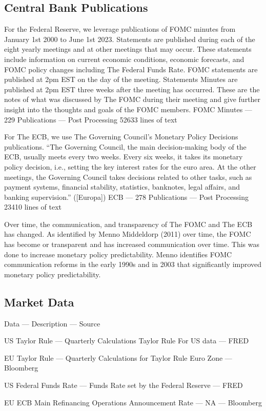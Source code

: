 \documentclass[12pt, letterpaper]{article}
\begin{document}
\subsection{Central Bank Publications}
For the Federal Reserve, we leverage publications of FOMC minutes from January 1st 2000 to June 1st 2023. Statements are published during each of the eight yearly meetings and at other meetings that may occur. These statements include information on current economic conditions, economic forecasts, and FOMC policy changes including The Federal Funds Rate. FOMC statements are published at 2pm EST on the day of the meeting. Statements Minutes are published at 2pm EST three weeks after the meeting has occurred. These are the notes of what was discussed by The FOMC during their meeting and give further insight into the thoughts and goals of the FOMC members. FOMC Minutes — 229 Publications — Post Processing 52633 lines of text 

For The ECB, we use The Governing Council’s Monetary Policy Decisions publications. “The Governing Council, the main decision-making body of the ECB, usually meets every two weeks. Every six weeks, it takes its monetary policy decision, i.e., setting the key interest rates for the euro area. At the other meetings, the Governing Council takes decisions related to other tasks, such as payment systems, financial stability, statistics, banknotes, legal affairs, and banking supervision.” ([Europa]) ECB — 278 Publications — Post Processing 23410 lines of text

Over time, the communication, and transparency of The FOMC and The ECB has changed. As identified by Menno Middeldorp (2011) over time, the FOMC has become or transparent and has increased communication over time. This was done to increase monetary policy predictability. Menno identifies FOMC communication reforms in the early 1990s and in 2003 that significantly improved monetary policy predictability. 
\subsection{Market Data}
Data — Description — Source 

US Taylor Rule — Quarterly Calculations Taylor Rule For US data — FRED

EU Taylor Rule — Quarterly Calculations for Taylor Rule Euro Zone — Bloomberg

US Federal Funds Rate — Funds Rate set by the Federal Reserve — FRED

EU ECB Main Refinancing Operations Announcement Rate — NA — Bloomberg
\end{document}
